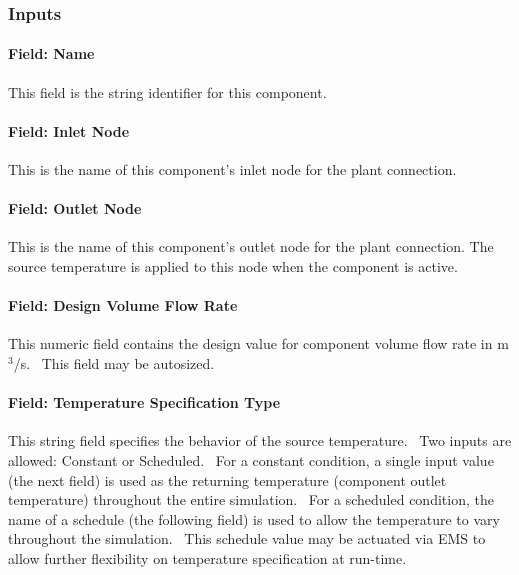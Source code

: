 \subsubsection{Inputs}\label{inputs-18-006}

\paragraph{Field: Name}\label{field-name-17-005}

This field is the string identifier for this component.

\paragraph{Field: Inlet Node}\label{field-inlet-node-000}

This is the name of this component's inlet node for the plant connection.

\paragraph{Field: Outlet Node}\label{field-outlet-node-000}

This is the name of this component's outlet node for the plant connection. The source temperature is applied to this node when the component is active.

\paragraph{Field: Design Volume Flow Rate}\label{field-design-volume-flow-rate}

This numeric field contains the design value for component volume flow rate in m\(^{3}\)/s.~ This field may be autosized.

\paragraph{Field: Temperature Specification Type}\label{field-temperature-specification-type}

This string field specifies the behavior of the source temperature.~ Two inputs are allowed: Constant or Scheduled.~ For a constant condition, a single input value (the next field) is used as the returning temperature (component outlet temperature) throughout the entire simulation.~ For a scheduled condition, the name of a schedule (the following field) is used to allow the temperature to vary throughout the simulation.~ This schedule value may be actuated via EMS to allow further flexibility on temperature specification at run-time.

